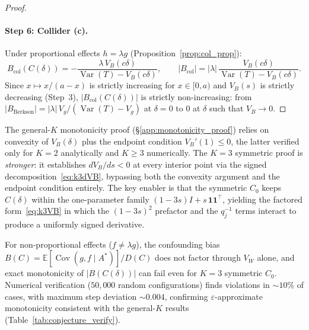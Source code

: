 \begin{proof}
\paragraph{Step 6: Collider (c).}
Under proportional effects $h=\lambda g$ (Proposition~\ref{prop:col_prop}):
\[
  B_{\mathrm{col}}(C(\delta)) = -\frac{\lambda\,V_B(c\delta)}{\operatorname{Var}(T)-V_B(c\delta)},
  \qquad
  |B_{\mathrm{col}}| = |\lambda|\,\frac{V_B(c\delta)}{\operatorname{Var}(T)-V_B(c\delta)}.
\]
Since $x\mapsto x/(a{-}x)$ is strictly increasing for $x\in[0,a)$
and $V_B(s)$ is strictly decreasing (Step~3),
$|B_{\mathrm{col}}(C(\delta))|$ is strictly non-increasing:
from $|B_{\mathrm{Berkson}}|=|\lambda|\,V_g/(\operatorname{Var}(T){-}V_g)$ at $\delta{=}0$
to $0$ at $\delta$ such that $V_B\to 0$.
\end{proof}

\begin{remark}
\label{rem:k3_vs_general}
The general-$K$ monotonicity proof (§\ref{app:monotonicity_proof}) relies on
convexity of $V_B(\delta)$ plus the endpoint condition $V_B'(1)\leq 0$,
the latter verified only for $K{=}2$ analytically and $K\geq 3$ numerically.
The $K{=}3$ symmetric proof is \emph{stronger}:
it establishes $dV_B/ds<0$ at every interior point via the signed decomposition~\eqref{eq:k3dVB},
bypassing both the convexity argument and the endpoint condition entirely.
The key enabler is that the symmetric $C_0$ keeps $C(\delta)$ within the one-parameter family
$(1{-}3s)I+s\,\mathbf{1}\mathbf{1}^\top$, yielding the factored form~\eqref{eq:k3VB}
in which the $(1{-}3s)^2$ prefactor and the $q_j^{-1}$ terms interact to produce
a uniformly signed derivative.
\end{remark}

\begin{remark}
\label{rem:k3_general}
For non-proportional effects ($f\neq\lambda g$), the confounding bias
$B(C)=\mathbb{E}[\operatorname{Cov}(g,f\mid A^*)]/D(C)$
does not factor through $V_W$ alone,
and exact monotonicity of $|B(C(\delta))|$ can fail even for $K{=}3$ symmetric $C_0$.
Numerical verification ($50{,}000$ random configurations) finds violations in ${\sim}10\%$ of cases,
with maximum step deviation ${\sim}0.004$,
confirming $\varepsilon$-approximate monotonicity consistent with the general-$K$ results
(Table~\ref{tab:conjecture_verify}).
\end{remark}
